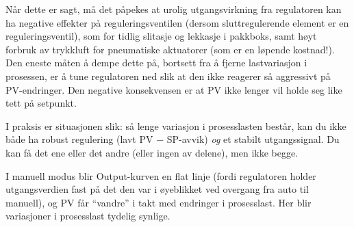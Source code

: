 Når dette er sagt, må det påpekes at urolig utgangsvirkning fra regulatoren kan ha negative effekter på reguleringsventilen (dersom sluttregulerende element er en reguleringsventil), som for tidlig slitasje og lekkasje i pakkboks, samt høyt forbruk av trykkluft for pneumatiske aktuatorer (som er en løpende kostnad!). Den eneste måten å dempe dette på, bortsett fra å fjerne lastvariasjon i prosessen, er å tune regulatoren ned slik at den ikke reagerer så aggressivt på PV-endringer. Den negative konsekvensen er at PV ikke lenger vil holde seg like tett på setpunkt.

I praksis er situasjonen slik: så lenge variasjon i prosesslasten består, kan du ikke både ha robust regulering (lavt PV $-$ SP-avvik) {\it og} et stabilt utgangssignal. Du kan få det ene eller det andre (eller ingen av delene), men ikke begge.

I manuell modus blir Output-kurven en flat linje (fordi regulatoren holder utgangsverdien fast på det den var i øyeblikket ved overgang fra auto til manuell), og PV får ``vandre'' i takt med endringer i prosesslast. Her blir variasjoner i prosesslast tydelig synlige.


